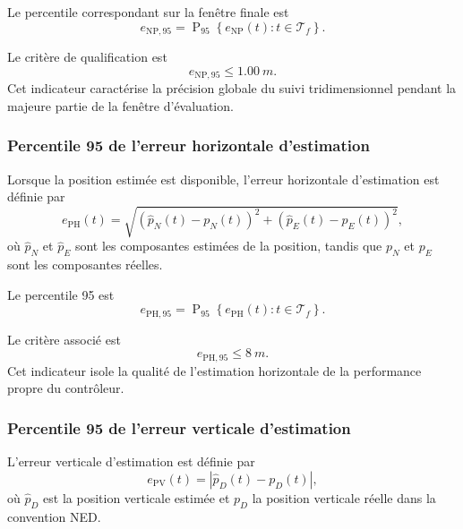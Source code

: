 \documentclass[11pt,a4paper,oneside]{report}
\begin{document}
Le percentile correspondant sur la fenêtre finale est
\begin{equation}
	e_{\mathrm{NP},95}
	=
	\operatorname{P}_{95}
	\left\{
	e_{\mathrm{NP}}(t):
	t\in\mathcal T_f
	\right\}.
	\label{eq_navigation_final_p95}
\end{equation}

Le critère de qualification est
\begin{equation}
	e_{\mathrm{NP},95}
	\leq
	\SI{1.00}{m}.
	\label{eq_navigation_p95_requirement}
\end{equation}
Cet indicateur caractérise la précision globale du suivi tridimensionnel pendant la majeure partie de la fenêtre d'évaluation.

\subsubsection{Percentile 95 de l'erreur horizontale d'estimation}

Lorsque la position estimée est disponible, l'erreur horizontale d'estimation est définie par
\begin{equation}
	e_{\mathrm{PH}}(t)
	=
	\sqrt{
		\left(\hat p_N(t)-p_N(t)\right)^2
		+
		\left(\hat p_E(t)-p_E(t)\right)^2
	},
	\label{eq_horizontal_estimation_error}
\end{equation}
où $\hat p_N$ et $\hat p_E$ sont les composantes estimées de la position, tandis que $p_N$ et $p_E$ sont les composantes réelles.

Le percentile 95 est
\begin{equation}
	e_{\mathrm{PH},95}
	=
	\operatorname{P}_{95}
	\left\{
	e_{\mathrm{PH}}(t):
	t\in\mathcal T_f
	\right\}.
	\label{eq_horizontal_estimation_p95}
\end{equation}

Le critère associé est
\begin{equation}
	e_{\mathrm{PH},95}
	\leq
	\SI{8}{m}.
	\label{eq_horizontal_assurance_requirement}
\end{equation}
Cet indicateur isole la qualité de l'estimation horizontale de la performance propre du contrôleur.

\subsubsection{Percentile 95 de l'erreur verticale d'estimation}

L'erreur verticale d'estimation est définie par
\begin{equation}
	e_{\mathrm{PV}}(t)
	=
	\left|
	\hat p_D(t)-p_D(t)
	\right|,
	\label{eq_vertical_estimation_error}
\end{equation}
où $\hat p_D$ est la position verticale estimée et $p_D$ la position verticale réelle dans la convention NED.
\end{document}
